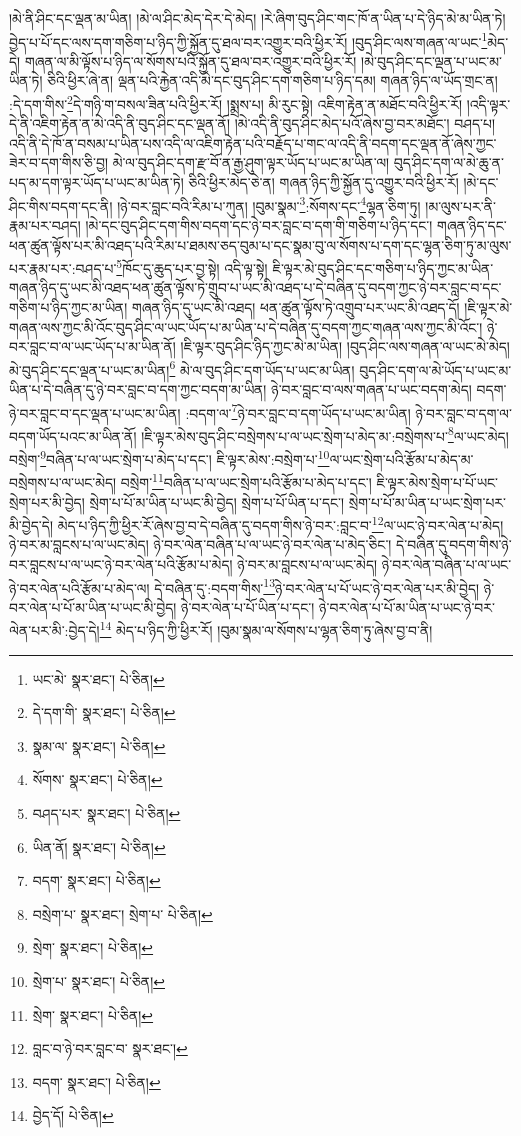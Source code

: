།མེ་ནི་ཤིང་དང་ལྡན་མ་ཡིན། །མེ་ལ་ཤིང་མེད་དེར་དེ་མེད། །རེ་ཞིག་བུད་ཤིང་གང་ཁོ་ན་ཡིན་པ་དེ་ཉིད་མེ་མ་ཡིན་ཏེ། བྱེད་པ་པོ་དང་ལས་དག་གཅིག་པ་ཉིད་ཀྱི་སྐྱོན་དུ་ཐལ་བར་འགྱུར་བའི་ཕྱིར་རོ། །བུད་ཤིང་ལས་གཞན་ལ་ཡང་\footnote{ཡང་མེ་  སྣར་ཐང་།  པེ་ཅིན། }མེད་དེ། གཞན་ལ་མི་ལྟོས་པ་ཉིད་ལ་སོགས་པའི་སྐྱོན་དུ་ཐལ་བར་འགྱུར་བའི་ཕྱིར་རོ། །མེ་བུད་ཤིང་དང་ལྡན་པ་ཡང་མ་ཡིན་ཏེ། ཅིའི་ཕྱིར་ཞེ་ན། ལྡན་པའི་རྐྱེན་འདི་མེ་དང་བུད་ཤིང་དག་གཅིག་པ་ཉིད་དམ། གཞན་ཉིད་ལ་ཡོད་གྲང་ན། :དེ་དག་གིས་\footnote{དེ་དག་གི་  སྣར་ཐང་།  པེ་ཅིན། }དེ་གཉི་ག་བསལ་ཟིན་པའི་ཕྱིར་རོ། །སྨྲས་པ། མི་རུང་སྟེ། འཇིག་རྟེན་ན་མཐོང་བའི་ཕྱིར་རོ། །འདི་ལྟར་དེ་ནི་འཇིག་རྟེན་ན་མེ་འདི་ནི་བུད་ཤིང་དང་ལྡན་ནོ། །མེ་འདི་ནི་བུད་ཤིང་མེད་པའོ་ཞེས་བྱ་བར་མཐོང་། བཤད་པ། འདི་ནི་དེ་ཁོ་ན་བསམ་པ་ཡིན་པས་འདི་ལ་འཇིག་རྟེན་པའི་བརྗོད་པ་གང་ལ་འདི་ནི་བདག་དང་ལྡན་ནོ་ཞེས་ཀྱང་ཟེར་བ་དག་གིས་ཅི་བྱ། མེ་ལ་བུད་ཤིང་དག་རྫ་བོ་ན་རྒྱ་ཤུག་ལྟར་ཡོད་པ་ཡང་མ་ཡིན་ལ། བུད་ཤིང་དག་ལ་མེ་ཆུ་ན་པད་མ་དག་ལྟར་ཡོད་པ་ཡང་མ་ཡིན་ཏེ། ཅིའི་ཕྱིར་མེད་ཅེ་ན། གཞན་ཉིད་ཀྱི་སྐྱོན་དུ་འགྱུར་བའི་ཕྱིར་རོ། །མེ་དང་ཤིང་གིས་བདག་དང་ནི། །ཉེ་བར་བླང་བའི་རིམ་པ་ཀུན། །བུམ་སྣམ་\footnote{སྣམ་ལ་  སྣར་ཐང་།  པེ་ཅིན། }:སོགས་དང་\footnote{སོགས་  སྣར་ཐང་།  པེ་ཅིན། }ལྷན་ཅིག་ཏུ། །མ་ལུས་པར་ནི་རྣམ་པར་བཤད། །མེ་དང་བུད་ཤིང་དག་གིས་བདག་དང་ཉེ་བར་བླང་བ་དག་གི་གཅིག་པ་ཉིད་དང་། གཞན་ཉིད་དང་ཕན་ཚུན་ལྟོས་པར་མི་འཐད་པའི་རིམ་པ་ཐམས་ཅད་བུམ་པ་དང་སྣམ་བུ་ལ་སོགས་པ་དག་དང་ལྷན་ཅིག་ཏུ་མ་ལུས་པར་རྣམ་པར་:བཤད་པ་\footnote{བཤད་པར་  སྣར་ཐང་།  པེ་ཅིན། }ཁོང་དུ་ཆུད་པར་བྱ་སྟེ། འདི་ལྟ་སྟེ། ཇི་ལྟར་མེ་བུད་ཤིང་དང་གཅིག་པ་ཉིད་ཀྱང་མ་ཡིན་གཞན་ཉིད་དུ་ཡང་མི་འཐད་ཕན་ཚུན་ལྟོས་ཏེ་གྲུབ་པ་ཡང་མི་འཐད་པ་དེ་བཞིན་དུ་བདག་ཀྱང་ཉེ་བར་བླང་བ་དང་གཅིག་པ་ཉིད་ཀྱང་མ་ཡིན། གཞན་ཉིད་དུ་ཡང་མི་འཐད། ཕན་ཚུན་ལྟོས་ཏེ་འགྲུབ་པར་ཡང་མི་འཐད་དོ། །ཇི་ལྟར་མེ་གཞན་ལས་ཀྱང་མི་འོང་བུད་ཤིང་ལ་ཡང་ཡོད་པ་མ་ཡིན་པ་དེ་བཞིན་དུ་བདག་ཀྱང་གཞན་ལས་ཀྱང་མི་འོང་། ཉེ་བར་བླང་བ་ལ་ཡང་ཡོད་པ་མ་ཡིན་ནོ། །ཇི་ལྟར་བུད་ཤིང་ཉིད་ཀྱང་མེ་མ་ཡིན། །བུད་ཤིང་ལས་གཞན་ལ་ཡང་མེ་མེད། མེ་བུད་ཤིང་དང་ལྡན་པ་ཡང་མ་ཡིན།\footnote{ཡིན་ནོ།  སྣར་ཐང་།  པེ་ཅིན། } མེ་ལ་བུད་ཤིང་དག་ཡོད་པ་ཡང་མ་ཡིན། བུད་ཤིང་དག་ལ་མེ་ཡོད་པ་ཡང་མ་ཡིན་པ་དེ་བཞིན་དུ་ཉེ་བར་བླང་བ་དག་ཀྱང་བདག་མ་ཡིན། ཉེ་བར་བླང་བ་ལས་གཞན་པ་ཡང་བདག་མེད། བདག་ཉེ་བར་བླང་བ་དང་ལྡན་པ་ཡང་མ་ཡིན། :བདག་ལ་\footnote{བདག་  སྣར་ཐང་།  པེ་ཅིན། }ཉེ་བར་བླང་བ་དག་ཡོད་པ་ཡང་མ་ཡིན། ཉེ་བར་བླང་བ་དག་ལ་བདག་ཡོད་པའང་མ་ཡིན་ནོ། །ཇི་ལྟར་མེས་བུད་ཤིང་བསྲེགས་པ་ལ་ཡང་སྲེག་པ་མེད་མ་:བསྲེགས་པ་\footnote{བསྲེག་པ་  སྣར་ཐང་། སྲེག་པ་  པེ་ཅིན། }ལ་ཡང་མེད། བསྲེག་\footnote{སྲེག་  སྣར་ཐང་།  པེ་ཅིན། }བཞིན་པ་ལ་ཡང་སྲེག་པ་མེད་པ་དང་། ཇི་ལྟར་མེས་:བསྲེག་པ་\footnote{སྲེག་པ་  སྣར་ཐང་།  པེ་ཅིན། }ལ་ཡང་སྲེག་པའི་རྩོམ་པ་མེད་མ་བསྲེགས་པ་ལ་ཡང་མེད། བསྲེག་\footnote{སྲེག་  སྣར་ཐང་།  པེ་ཅིན། }བཞིན་པ་ལ་ཡང་སྲེག་པའི་རྩོམ་པ་མེད་པ་དང་། ཇི་ལྟར་མེས་སྲེག་པ་པོ་ཡང་སྲེག་པར་མི་བྱེད། སྲེག་པ་པོ་མ་ཡིན་པ་ཡང་མི་བྱེད། སྲེག་པ་པོ་ཡིན་པ་དང་། སྲེག་པ་པོ་མ་ཡིན་པ་ཡང་སྲེག་པར་མི་བྱེད་དེ། མེད་པ་ཉིད་ཀྱི་ཕྱིར་རོ་ཞེས་བྱ་བ་དེ་བཞིན་དུ་བདག་གིས་ཉེ་བར་:བླང་བ་\footnote{བླང་བ་ཉེ་བར་བླང་བ་  སྣར་ཐང་། }ལ་ཡང་ཉེ་བར་ལེན་པ་མེད། ཉེ་བར་མ་བླངས་པ་ལ་ཡང་མེད། ཉེ་བར་ལེན་བཞིན་པ་ལ་ཡང་ཉེ་བར་ལེན་པ་མེད་ཅིང་། དེ་བཞིན་དུ་བདག་གིས་ཉེ་བར་བླངས་པ་ལ་ཡང་ཉེ་བར་ལེན་པའི་རྩོམ་པ་མེད། ཉེ་བར་མ་བླངས་པ་ལ་ཡང་མེད། ཉེ་བར་ལེན་བཞིན་པ་ལ་ཡང་ཉེ་བར་ལེན་པའི་རྩོམ་པ་མེད་ལ། དེ་བཞིན་དུ་:བདག་གིས་\footnote{བདག་  སྣར་ཐང་།  པེ་ཅིན། }ཉེ་བར་ལེན་པ་པོ་ཡང་ཉེ་བར་ལེན་པར་མི་བྱེད། ཉེ་བར་ལེན་པ་པོ་མ་ཡིན་པ་ཡང་མི་བྱེད། ཉེ་བར་ལེན་པ་པོ་ཡིན་པ་དང་། ཉེ་བར་ལེན་པ་པོ་མ་ཡིན་པ་ཡང་ཉེ་བར་ལེན་པར་མི་:བྱེད་དེ།\footnote{བྱེད་དོ།  པེ་ཅིན། } མེད་པ་ཉིད་ཀྱི་ཕྱིར་རོ། །བུམ་སྣམ་ལ་སོགས་པ་ལྷན་ཅིག་ཏུ་ཞེས་བྱ་བ་ནི། 
